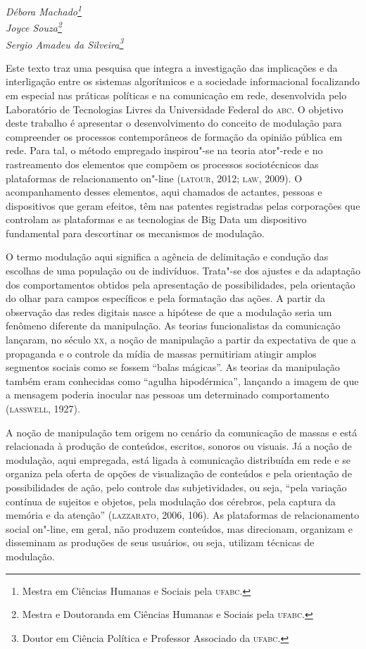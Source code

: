 \begin{flushright}
\emph{Débora Machado\footnote{Mestra em Ciências Humanas e Sociais pela \textsc{ufabc}.}\\Joyce
Souza\footnote{Mestra e Doutoranda em Ciências Humanas e Sociais pela \textsc{ufabc}.}\\
Sergio Amadeu da Silveira\footnote{Doutor em Ciência Política e Professor Associado da \textsc{ufabc}.}}
\end{flushright}

Este texto traz uma pesquisa que integra a investigação das implicações
e da interligação entre os sistemas algorítmicos e a sociedade
informacional focalizando em especial nas práticas políticas e na
comunicação em rede, desenvolvida pelo Laboratório de Tecnologias Livres
da Universidade Federal do \textsc{abc}. O objetivo deste trabalho é apresentar o
desenvolvimento do conceito de modulação para compreender os processos
contemporâneos de formação da opinião pública em rede. Para tal, o
método empregado inspirou"-se na teoria ator"-rede e no rastreamento dos
elementos que compõem os processos sociotécnicos das plataformas de
relacionamento on"-line (\textsc{latour}, 2012; \textsc{law}, 2009). O acompanhamento
desses elementos, aqui chamados de actantes, pessoas e dispositivos que
geram efeitos, têm nas patentes registradas pelas corporações que
controlam as plataformas e as tecnologias de Big Data um dispositivo
fundamental para descortinar os mecanismos de modulação.

O termo modulação aqui significa a agência de delimitação e condução das
escolhas de uma população ou de indivíduos. Trata"-se dos ajustes e da
adaptação dos comportamentos obtidos pela apresentação de
possibilidades, pela orientação do olhar para campos específicos e pela
formatação das ações. A partir da observação das redes digitais nasce a
hipótese de que a modulação seria um fenômeno diferente da manipulação.
As teorias funcionalistas da comunicação lançaram, no século \textsc{xx}, a noção
de manipulação a partir da expectativa de que a propaganda e o controle
da mídia de massas permitiriam atingir amplos segmentos sociais como se
fossem ``balas mágicas''. As teorias da manipulação também eram
conhecidas como ``agulha hipodérmica'', lançando a imagem de que a
mensagem poderia inocular nas pessoas um determinado comportamento
(\textsc{lasswell}, 1927).

A noção de manipulação tem origem no cenário da comunicação de massas e
está relacionada à produção de conteúdos, escritos, sonoros ou visuais.
Já a noção de modulação, aqui empregada, está ligada à comunicação
distribuída em rede e se organiza pela oferta de opções de visualização
de conteúdos e pela orientação de possibilidades de ação, pelo controle
das subjetividades, ou seja, ``pela variação contínua de sujeitos e
objetos, pela modulação dos cérebros, pela captura da memória e da
atenção'' (\textsc{lazzarato}, 2006, 106). As plataformas de relacionamento
social on"-line, em geral, não produzem conteúdos, mas direcionam,
organizam e disseminam as produções de seus usuários, ou seja, utilizam
técnicas de modulação.

